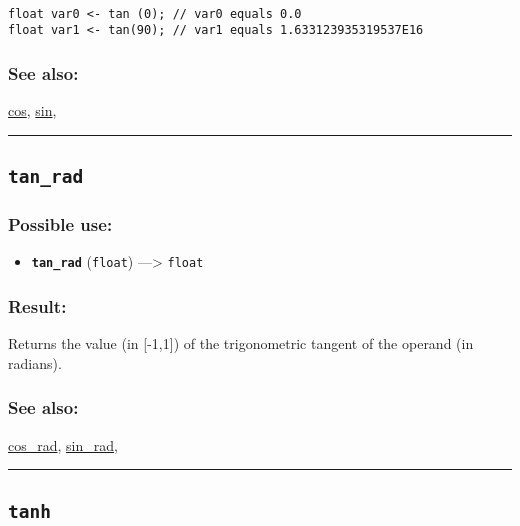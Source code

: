 \documentclass[]{book}
\providecommand{\tightlist}{%
  \setlength{\itemsep}{0pt}\setlength{\parskip}{0pt}}
\theoremstyle{definition}
\theoremstyle{definition}
\theoremstyle{definition}
\theoremstyle{remark}
\begin{document}
\begin{verbatim}
 
float var0 <- tan (0); // var0 equals 0.0 
float var1 <- tan(90); // var1 equals 1.633123935319537E16
\end{verbatim}

\subsubsection{See also:}\label{see-also-201}

\href{OperatorsBC\#cos}{cos}, \href{OperatorsSZ\#sin}{sin},

\begin{center}\rule{0.5\linewidth}{\linethickness}\end{center}

\subsection{\texorpdfstring{\texttt{tan\_rad}}{tan\_rad}}\label{tan_rad}

\subsubsection{Possible use:}\label{possible-use-513}

\begin{itemize}
\tightlist
\item
  \textbf{\texttt{tan\_rad}} (\texttt{float}) ---\textgreater{}
  \texttt{float}
\end{itemize}

\subsubsection{Result:}\label{result-496}

Returns the value (in {[}-1,1{]}) of the trigonometric tangent of the
operand (in radians).

\subsubsection{See also:}\label{see-also-202}

\href{OperatorsBC\#cos_rad}{cos\_rad},
\href{OperatorsSZ\#sin_rad}{sin\_rad},

\begin{center}\rule{0.5\linewidth}{\linethickness}\end{center}

\subsection{\texorpdfstring{\texttt{tanh}}{tanh}}\label{tanh}
\end{document}
